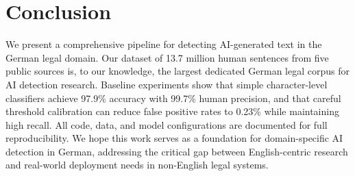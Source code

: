 \documentclass[11pt,a4paper]{article}
\begin{document}
\section{Conclusion}

We present a comprehensive pipeline for detecting AI-generated text in the German legal domain. Our dataset of 13.7 million human sentences from five public sources is, to our knowledge, the largest dedicated German legal corpus for AI detection research. Baseline experiments show that simple character-level classifiers achieve 97.9\% accuracy with 99.7\% human precision, and that careful threshold calibration can reduce false positive rates to 0.23\% while maintaining high recall. All code, data, and model configurations are documented for full reproducibility. We hope this work serves as a foundation for domain-specific AI detection in German, addressing the critical gap between English-centric research and real-world deployment needs in non-English legal systems.



\end{document}
